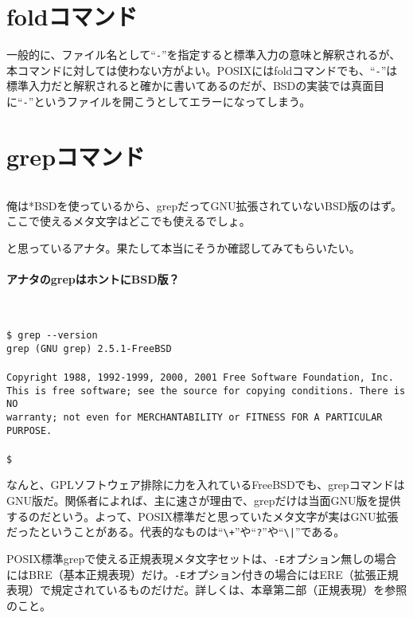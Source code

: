 \section{foldコマンド}
\label{allenvs:fold}

一般的に、ファイル名として``\verb|-|''を指定すると標準入力の意味と解釈されるが、本コマンドに対しては使わない方がよい。POSIXにはfoldコマンドでも、``\verb|-|''は標準入力だと解釈されると確かに書いてあるのだが、BSDの実装では真面目に``\verb|-|''というファイルを開こうとしてエラーになってしまう。

\section{grepコマンド}
\label{allenvs:grep}

\noindent
$\!\!\!\!\!$
\begin{grshfboxit}{160.0mm}
	俺は*BSDを使っているから、grepだってGNU拡張されていないBSD版のはず。ここで使えるメタ文字はどこでも使えるでしょ。
\end{grshfboxit}
と思っているアナタ。果たして本当にそうか確認してみてもらいたい。

\paragraph{アナタのgrepはホントにBSD版？} 　\\
\begin{screen}
	\verb|$ grep --version| \return \\
	\verb|grep (GNU grep) 2.5.1-FreeBSD| \return \\
	\verb|| \\
	\verb|Copyright 1988, 1992-1999, 2000, 2001 Free Software Foundation, Inc.| \\
	\verb|This is free software; see the source for copying conditions. There is NO| \\
	\verb|warranty; not even for MERCHANTABILITY or FITNESS FOR A PARTICULAR PURPOSE.| \\
	\verb|| \\
	\verb|$ |
\end{screen}

なんと、GPLソフトウェア排除に力を入れているFreeBSDでも、grepコマンドはGNU版だ。関係者によれば、主に速さが理由で、grepだけは当面GNU版を提供するのだという。よって、POSIX標準だと思っていたメタ文字が実はGNU拡張だったということがある。代表的なものは``\verb|\+|''や``\verb|?|''や``\verb!\|!''である。

POSIX標準grepで使える正規表現メタ文字セットは、\verb|-E|オプション無しの場合にはBRE（基本正規表現）だけ。\verb|-E|オプション付きの場合にはERE（拡張正規表現）で規定されているものだけだ。詳しくは、本章第二部（正規表現）を参照のこと。

